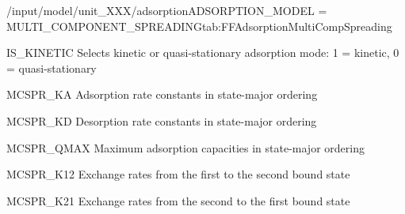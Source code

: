 \begin{condsubgroup}{/input/model/unit\_XXX/adsorption}{ADSORPTION\_MODEL = MULTI\_COMPONENT\_SPREADING}{tab:FFAdsorptionMultiCompSpreading}
\begin{dataset}[type=int,range={$\{ 0,1 \}$},length=1]{IS\_KINETIC}
    Selects kinetic or quasi-stationary adsorption mode: 1 = kinetic, 0 = quasi-stationary
  \end{dataset}
  \begin{dataset}[unit=\si{\cubic\metre\of{MP}\per\mol\per\second}, type = double, range={$\geq 0$}, length={\texttt{NTOTALBND}}]{MCSPR\_KA} 
    Adsorption rate constants in state-major ordering   
  \end{dataset}  
  \begin{dataset}[unit=\si{\per\second}, type = double, range={$\geq 0$}, length={\texttt{NTOTALBND}}]{MCSPR\_KD} 
    Desorption rate constants in state-major ordering  
  \end{dataset}  
  \begin{dataset}[unit=\si{\mol\per\cubic\metre\of{SP}}, type = double, range={$> 0$}, length={\texttt{NTOTALBND}}]{MCSPR\_QMAX} 
    Maximum adsorption capacities in state-major ordering  
  \end{dataset}  
  \begin{dataset}[unit=\si{\per\second}, type = double, range={$\geq 0$}, length={\texttt{NCOMP}}]{MCSPR\_K12} 
    Exchange rates from the first to the second bound state 
  \end{dataset}  
  \begin{dataset}[unit=\si{\per\second}, type = double, range={$\geq 0$}, length={\texttt{NCOMP}}]{MCSPR\_K21} 
    Exchange rates from the second to the first bound state 
  \end{dataset}  
\end{condsubgroup}

